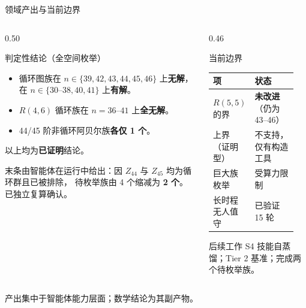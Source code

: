 \documentclass[aspectratio=169,11pt]{beamer}
\newcommand{\key}[1]{\textbf{\color{accent}#1}}
\begin{document}
\begin{frame}{领域产出与当前边界}
  \begin{columns}[T,onlytextwidth]
    \begin{column}{0.50\textwidth}
      \begin{block}{判定性结论（全空间枚举）}
        \scriptsize
        \begin{itemize}
          \item 循环图族在 $n\in\{39,42,43,44,45,46\}$ 上\textbf{无解}，
                在 $n\in\{30\text{--}38,40,41\}$ 上\textbf{有解}。
          \item $R(4,6)$ 循环族在 $n=36\text{--}41$ 上\textbf{全无解}。
          \item 44/45 阶非循环阿贝尔族\textbf{各仅 1 个}。
        \end{itemize}
        \vspace{0.2em}
        以上均为\textbf{已证明}结论。
        \vspace{0.3em}

        末条由智能体在运行中给出：因 $Z_{44}$ 与 $Z_{45}$ 均为循环群且已被排除，
        待枚举族由 4 个缩减为 \key{2 个}。已独立复算确认。
      \end{block}
    \end{column}

    \begin{column}{0.46\textwidth}
      \begin{block}{当前边界}
        \scriptsize
        \begin{tabular}{@{}p{0.32\linewidth}p{0.54\linewidth}@{}}
          \toprule
          项 & 状态 \\
          \midrule
          $R(5,5)$ 的界 & \textbf{未改进}（仍为 43--46） \\
          上界（证明型） & 不支持，仅有构造工具 \\
          巨大族枚举 & 受算力限制 \\
          长时程无人值守 & 已验证 15 轮 \\
          \bottomrule
        \end{tabular}
      \end{block}

      \begin{block}{后续工作}
        \scriptsize
        S4 技能自蒸馏；Tier 2 基准；完成两个待枚举族。
      \end{block}
    \end{column}
  \end{columns}

  \vspace{0.3em}
  \footnotesize\color{black!70}
  产出集中于智能体能力层面；数学结论为其副产物。
\end{frame}
\end{document}
